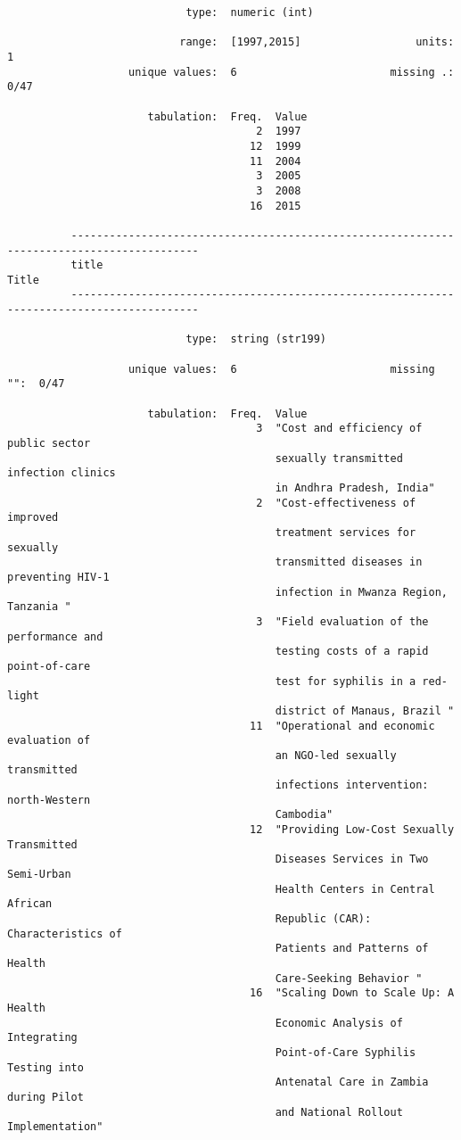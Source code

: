 \documentclass{article}
\begin{document}
\begin{verbatim}
                            type:  numeric (int)
          
                           range:  [1997,2015]                  units:  1
                   unique values:  6                        missing .:  0/47
          
                      tabulation:  Freq.  Value
                                       2  1997
                                      12  1999
                                      11  2004
                                       3  2005
                                       3  2008
                                      16  2015
          
          ------------------------------------------------------------------------------------------
          title                                                                                Title
          ------------------------------------------------------------------------------------------
          
                            type:  string (str199)
          
                   unique values:  6                        missing "":  0/47
          
                      tabulation:  Freq.  Value
                                       3  "Cost and efficiency of public sector
                                          sexually transmitted infection clinics
                                          in Andhra Pradesh, India"
                                       2  "Cost-effectiveness of improved
                                          treatment services for sexually
                                          transmitted diseases in preventing HIV-1
                                          infection in Mwanza Region, Tanzania "
                                       3  "Field evaluation of the performance and
                                          testing costs of a rapid point-of-care
                                          test for syphilis in a red-light
                                          district of Manaus, Brazil "
                                      11  "Operational and economic evaluation of
                                          an NGO-led sexually transmitted
                                          infections intervention: north-Western
                                          Cambodia"
                                      12  "Providing Low-Cost Sexually Transmitted
                                          Diseases Services in Two Semi-Urban
                                          Health Centers in Central African
                                          Republic (CAR): Characteristics of
                                          Patients and Patterns of Health
                                          Care-Seeking Behavior "
                                      16  "Scaling Down to Scale Up: A Health
                                          Economic Analysis of Integrating
                                          Point-of-Care Syphilis Testing into
                                          Antenatal Care in Zambia during Pilot
                                          and National Rollout Implementation"
          

\end{verbatim}
\end{document}
